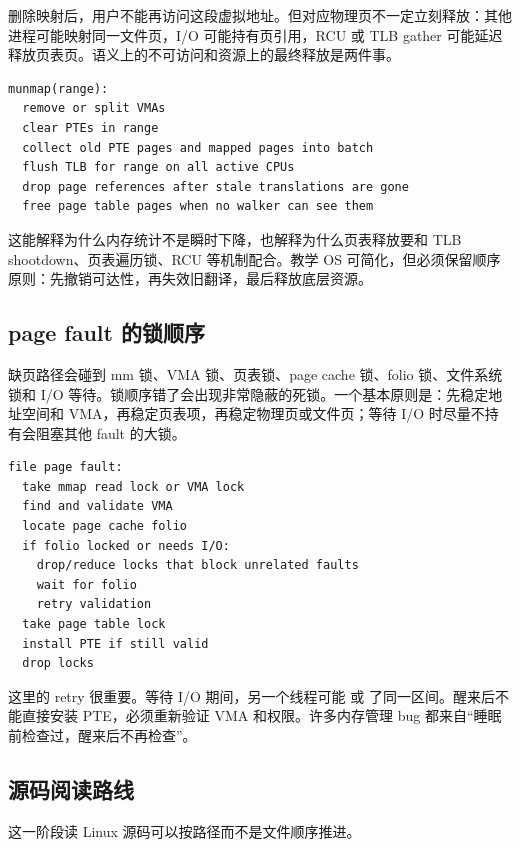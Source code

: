  删除映射后，用户不能再访问这段虚拟地址。但对应物理页不一定立刻释放：其他进程可能映射同一文件页，I/O 可能持有页引用，RCU 或 TLB gather 可能延迟释放页表页。语义上的不可访问和资源上的最终释放是两件事。

\begin{lstlisting}
munmap(range):
  remove or split VMAs
  clear PTEs in range
  collect old PTE pages and mapped pages into batch
  flush TLB for range on all active CPUs
  drop page references after stale translations are gone
  free page table pages when no walker can see them
\end{lstlisting}

这能解释为什么内存统计不是瞬时下降，也解释为什么页表释放要和 TLB shootdown、页表遍历锁、RCU 等机制配合。教学 OS 可简化，但必须保留顺序原则：先撤销可达性，再失效旧翻译，最后释放底层资源。

\subsection{page fault 的锁顺序}

缺页路径会碰到 mm 锁、VMA 锁、页表锁、page cache 锁、folio 锁、文件系统锁和 I/O 等待。锁顺序错了会出现非常隐蔽的死锁。一个基本原则是：先稳定地址空间和 VMA，再稳定页表项，再稳定物理页或文件页；等待 I/O 时尽量不持有会阻塞其他 fault 的大锁。

\begin{lstlisting}
file page fault:
  take mmap read lock or VMA lock
  find and validate VMA
  locate page cache folio
  if folio locked or needs I/O:
    drop/reduce locks that block unrelated faults
    wait for folio
    retry validation
  take page table lock
  install PTE if still valid
  drop locks
\end{lstlisting}

这里的 retry 很重要。等待 I/O 期间，另一个线程可能  或  了同一区间。醒来后不能直接安装 PTE，必须重新验证 VMA 和权限。许多内存管理 bug 都来自“睡眠前检查过，醒来后不再检查”。

\subsection{源码阅读路线}

这一阶段读 Linux 源码可以按路径而不是文件顺序推进。

